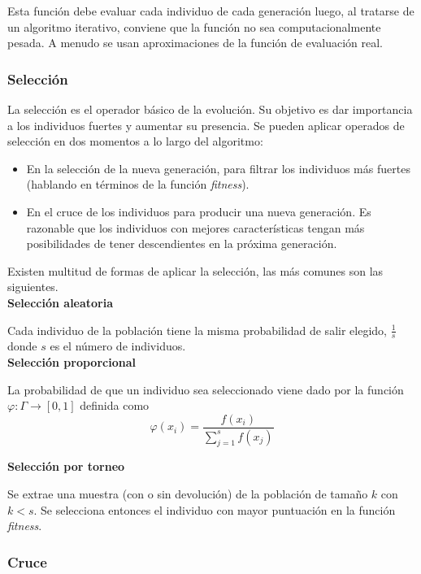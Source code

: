 \documentclass[12pt,a4paper]{article}
\begin{document}
			Esta funci\'on debe evaluar cada individuo de cada generaci\'on luego, al tratarse de un algoritmo iterativo, conviene que la funci\'on no sea computacionalmente pesada. A menudo se usan aproximaciones de la funci\'on de evaluaci\'on real.
		
			\subsubsection{Selecci\'on}
			La selecci\'on es el operador b\'asico de la evoluci\'on. Su objetivo es dar importancia a los individuos fuertes y aumentar su presencia. Se pueden aplicar operados de selecci\'on en dos momentos a lo largo del algoritmo:
			\begin{itemize}
				\item En la selecci\'on de la nueva generaci\'on, para filtrar los individuos m\'as fuertes (hablando en t\'erminos de la funci\'on \textit{fitness}).
				\item En el cruce de los individuos para producir una nueva generaci\'on. Es razonable que los individuos con mejores caracter\'isticas tengan m\'as posibilidades de tener descendientes en la pr\'oxima generaci\'on.
			\end{itemize}
			Existen multitud de formas de aplicar la selecci\'on, las m\'as comunes son las siguientes.\\
			
			\textbf{Selecci\'on aleatoria}
			
			Cada individuo de la poblaci\'on tiene la misma probabilidad de salir elegido, $\frac{1}{s}$ donde $s$ es el n\'umero de individuos.\\
			
			\textbf{Selecci\'on proporcional}
			
			La probabilidad de que un individuo sea seleccionado viene dado por la funci\'on $\varphi:\Gamma\rightarrow [0,1]$ definida como
			\[\varphi(x_i)=\frac{f(x_i)}{\sum_{j=1}^{s}f(x_j)}\]
			
			\textbf{Selecci\'on por torneo}
			
			Se extrae una muestra (con o sin devoluci\'on) de la poblaci\'on de tama\~no $k$ con $k<s$. Se selecciona entonces el individuo con mayor puntuaci\'on en la funci\'on \textit{fitness}.
			
			\subsubsection{Cruce}
			
\end{document}
